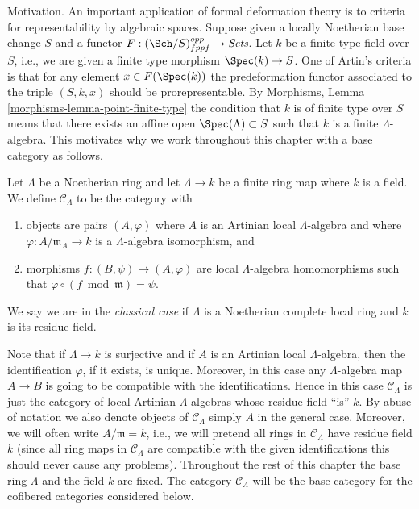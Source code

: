 \noindent
Motivation. An important application of formal deformation theory is
to criteria for representability by algebraic spaces. Suppose given a
locally Noetherian base change $S$ and a functor
$F : (\Sch/S)_{fppf}^{opp} \to \textit{Sets}$.
Let $k$ be a finite type field over $S$, i.e., we are given a
finite type morphism $\Spec(k) \to S$.
One of Artin's criteria is that for any element $x \in F(\Spec(k))$
the predeformation functor associated to
the triple $(S, k, x)$ should be prorepresentable. By
Morphisms, Lemma \ref{morphisms-lemma-point-finite-type}
the condition that $k$ is of finite type over $S$ means that there exists
an affine open $\Spec(\Lambda) \subset S$ such that $k$
is a finite $\Lambda$-algebra. This motivates why we work throughout
this chapter with a base category as follows.

\begin{definition}
\label{definition-CLambda}
Let $\Lambda$ be a Noetherian ring and let $\Lambda \to k$ be a finite
ring map where $k$ is a field. We define {\it $\mathcal{C}_\Lambda$} to be
the category with
\begin{enumerate}
\item objects are pairs $(A, \varphi)$ where $A$ is an Artinian local
$\Lambda$-algebra and where $\varphi : A/\mathfrak m_A \to k$ is a
$\Lambda$-algebra isomorphism, and
\item morphisms $f : (B, \psi) \to (A, \varphi)$ are local $\Lambda$-algebra
homomorphisms such that $\varphi \circ (f \bmod \mathfrak m) = \psi$.
\end{enumerate}
We say we are in the {\it classical case} if $\Lambda$ is a Noetherian
complete local ring and $k$ is its residue field.
\end{definition}

\noindent
Note that if $\Lambda \to k$ is surjective and if $A$ is an Artinian local
$\Lambda$-algebra, then the identification $\varphi$, if it exists,
is unique. Moreover, in this case any $\Lambda$-algebra map $A \to B$ is
going to be compatible with the identifications. Hence in this case
$\mathcal{C}_\Lambda$ is just the category of local Artinian $\Lambda$-algebras
whose residue field ``is'' $k$. By abuse of notation we also denote objects of
$\mathcal{C}_\Lambda$ simply $A$ in the general case. Moreover, we will
often write $A/\mathfrak m = k$, i.e., we will pretend all rings in
$\mathcal{C}_\Lambda$ have residue field $k$ (since all ring maps in
$\mathcal{C}_\Lambda$ are compatible with the given identifications this
should never cause any problems).
Throughout the rest of this chapter the base ring $\Lambda$ and the
field $k$ are fixed. The category $\mathcal{C}_\Lambda$ will be the base
category for the cofibered categories considered below.

